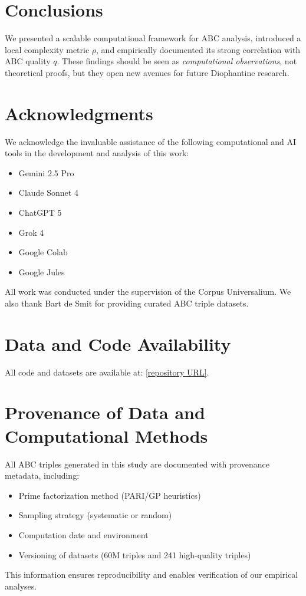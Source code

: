\documentclass[11pt,a4paper]{article}
\begin{document}
\section{Conclusions}

We presented a scalable computational framework for ABC analysis, introduced a local complexity metric $\rho$, and empirically documented its strong correlation with ABC quality $q$. These findings should be seen as \emph{computational observations}, not theoretical proofs, but they open new avenues for future Diophantine research.

\section*{Acknowledgments}
We acknowledge the invaluable assistance of the following computational and AI tools in the development and analysis of this work:
\begin{itemize}
    \item Gemini 2.5 Pro
    \item Claude Sonnet 4
    \item ChatGPT 5
    \item Grok 4
    \item Google Colab
    \item Google Jules
\end{itemize}
All work was conducted under the supervision of the Corpus Universalium.
We also thank Bart de Smit for providing curated ABC triple datasets.

\section*{Data and Code Availability}
All code and datasets are available at: \url{[repository URL]}.

\appendix
\section*{Provenance of Data and Computational Methods}
All ABC triples generated in this study are documented with provenance metadata, including:
\begin{itemize}
    \item Prime factorization method (PARI/GP heuristics)
    \item Sampling strategy (systematic or random)
    \item Computation date and environment
    \item Versioning of datasets (60M triples and 241 high-quality triples)
\end{itemize}
This information ensures reproducibility and enables verification of our empirical analyses.
\end{document}
